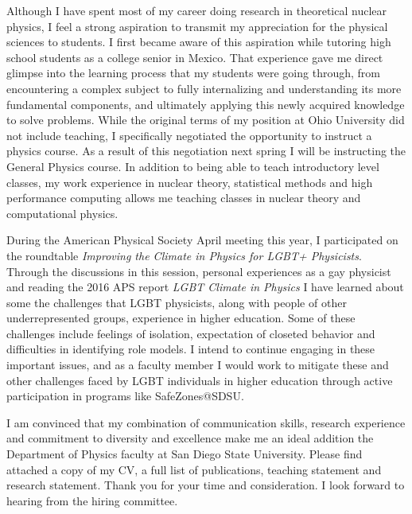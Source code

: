 Although I have spent most of my career doing research in theoretical
nuclear physics, I feel a strong aspiration to transmit my
appreciation for the physical sciences to students. I first became
aware of this aspiration while tutoring high school students as a
college senior in Mexico. That experience gave me direct glimpse into
the learning process that my students were going through, from
encountering a complex subject to fully internalizing and
understanding its more fundamental components, and ultimately applying
this newly acquired knowledge to solve problems. While the original
terms of my position at Ohio University did not include teaching, I
specifically negotiated the opportunity to instruct a physics
course. As a result of this negotiation next spring I will be
instructing the General Physics course.  
%
%
In addition to being able to teach
introductory level classes, my work experience in nuclear theory,
statistical methods and high performance computing allows me teaching
classes in nuclear theory and computational physics.

During the American Physical Society April meeting this year, I
participated on the roundtable \emph{Improving the Climate in Physics
for LGBT+ Physicists}. Through the discussions in this session,
personal experiences as a gay physicist and reading the 2016 APS
report \emph{LGBT Climate in Physics} I have learned about some the
challenges that LGBT physicists, along with people of other
underrepresented groups, experience in higher education. Some of these
challenges include feelings of isolation, expectation of closeted
behavior and difficulties in identifying role models. I intend to
continue engaging in these important issues, and as a faculty member I
would work to mitigate these and other challenges faced by LGBT
individuals in higher education through active participation in
programs like SafeZones@SDSU.


I am convinced that my combination of communication skills, research
experience and commitment to diversity and excellence make me an
ideal addition the Department of Physics faculty at San Diego State
University. Please find attached a copy of my CV, a full list of
publications, teaching statement and research statement. Thank you for
your time and consideration. I look forward to hearing from the hiring
committee.


\makeletterclosing


